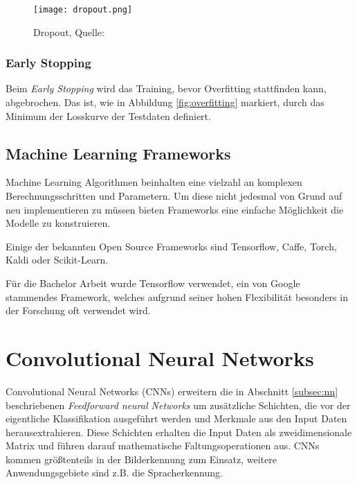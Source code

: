 \begin{figure}[H]
    \centering
    \texttt{[image: dropout.png]}
    \caption{Dropout, Quelle: \cite{maksutovDeepStudyNot2018}}
    \label{fig:dropout}
\end{figure}


\subsubsection{Early Stopping}
Beim \textit{Early Stopping} wird das Training, 
bevor Overfitting stattfinden kann, abgebrochen.
Das ist, wie in Abbildung \ref{fig:overfitting}
markiert, durch das Minimum der Losskurve der Testdaten 
definiert.



\subsection{Machine Learning Frameworks}

Machine Learning Algorithmen beinhalten eine vielzahl an komplexen
Berechnungsschritten und Parametern. Um diese nicht jedesmal 
von Grund auf neu implementieren zu müssen bieten 
Frameworks eine einfache Möglichkeit die Modelle zu konstruieren.

Einige der bekannten Open Source Frameworks sind Tensorflow,
Caffe, Torch, Kaldi oder Scikit-Learn.

Für die Bachelor Arbeit wurde Tensorflow verwendet,
ein von Google stammendes Framework,
welches aufgrund seiner hohen Flexibilität besonders 
in der Forschung oft verwendet wird.



\section{Convolutional Neural Networks}\label{subsec:cnn}

Convolutional Neural Networks (CNNs) erweitern 
die in Abschnitt \ref{subsec:nn} beschriebenen
\textit{Feedforward neural Networks} um zusätzliche Schichten,
die vor der eigentliche Klassifikation ausgeführt werden
und Merkmale aus den Input Daten herausextrahieren.
Diese Schichten erhalten die Input Daten als
zweidimensionale Matrix und führen darauf 
mathematische Faltungsoperationen aus.
CNNs kommen größtenteils in der Bilderkennung zum 
Einsatz, weitere Anwendungsgebiete sind 
z.B. die Spracherkennung.

